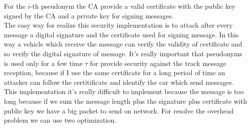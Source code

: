 For the $i$-th pseudonym the CA provide a valid certificate with the public key signed by the CA and a private key for signing messages.\\
The easy way for realize this security implementation is to attach after every message a digital signature and the certificate used for signing message. In this way a vehicle which receive the message can verify the validity of certificate and so verify the digital signature of message. It's really important that pseudonyms is used only for a few time $\tau$ for provide security against the track message reception, because if I use the same certificate for a long period of time an attacker can follow the certitificate and identify the car which send messages. This implementation it's really difficult to implement because the message is too long because if we sum the message length plus the signature plus certificate with public key we have a big packet to send on network. For resolve the overhead problem we can use two optimization\cite{calandriello}.
